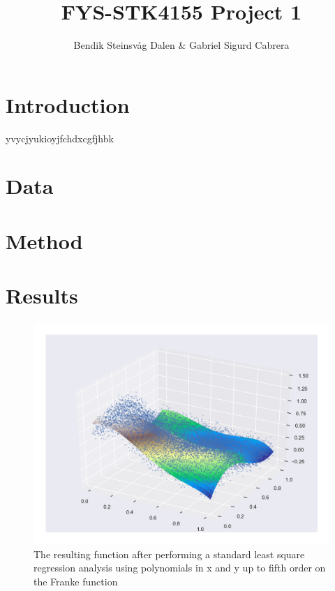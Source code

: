 \documentclass[a4paper,10pt,english]{article}
\begin{document}

\title{FYS-STK4155 Project 1}
\author{Bendik Steinsvåg Dalen \& Gabriel Sigurd Cabrera}
\maketitle

\begin{abstract}

\end{abstract}

\section{Introduction}
\label{sec:introduction}

yvycjyukioyjfchdxcgfjhbk
\section{Data}
\label{sec:data}

\section{Method}
\label{sec:method}

\section{Results}
\label{sec:results}


\begin{figure}[h!]
	\centering 
	\includegraphics[scale=0.6]{../results/part_a_reg.pdf}
	\caption{The resulting function after performing a standard least square regression analysis using polynomials in x and y up to fifth order on the Franke function}
	\label{part_a}
\end{figure}
\end{document}
